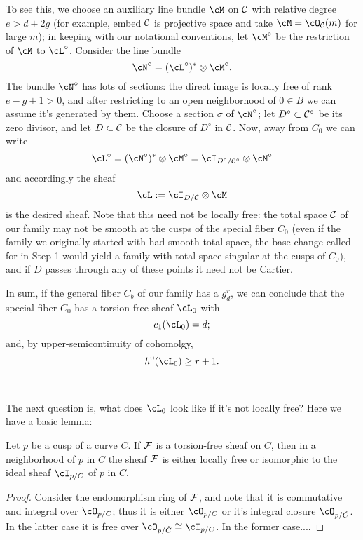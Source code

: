 To see this, we choose an auxiliary line bundle $\cM$ on $\cC$ with relative degree $e > d + 2g$ (for example, embed $\cC$ is projective space and take $\cM = \cO_{\cC}(m)$ for large $m$); in keeping with our notational conventions, let $\cM^\circ$ be the restriction of $\cM$ to $\cL^\circ$. Consider the line bundle 
$$
\cN^\circ = (\cL^\circ)^* \otimes \cM^\circ.
$$
The bundle $\cN^\circ$ has lots of sections: the direct image is locally free of rank $e-g+1 > 0$, and after restricting to an open neighborhood of $0 \in B$ we can assume it's generated by them. Choose a section $\sigma$ of $\cN^\circ$; let $D^\circ \subset \cC^\circ$ be its zero divisor, and let $D \subset \cC$ be the closure of $D^\circ$ in $\cC$. Now, away from $C_0$ we can write
$$
\cL^\circ = (\cN^\circ)^* \otimes \cM^\circ = \cI_{D^\circ/\cC^\circ} \otimes \cM^\circ
$$
and accordingly the sheaf
$$
\cL := \cI_{D/\cC} \otimes \cM
$$
is the desired sheaf. Note that this need not be locally free: the total space $\cC$ of our family may not be smooth at the cusps of the special fiber $C_0$ (even if the family we originally started with had smooth total space, the base change called for in Step 1 would yield a family with  total space singular at the cusps of $C_0$), and if $D$ passes through any of these points it need not be Cartier.

In sum, if the general fiber $C_b$ of our family has a $g^r_d$, we can conclude that the special fiber $C_0$ has a torsion-free sheaf $\cL_0$ with 
$$
c_1(\cL_0) = d;
$$
and, by upper-semicontinuity of cohomolgy,
$$
h^0(\cL_0) \geq r+1.
$$

\


The next question is, what does $\cL_0$ look like if it's not locally free? Here we have a basic lemma:

\begin{lemma}\label{torsion free at cusp}
Let $p$ be a  cusp of a curve $C$. If $\cF$ is a torsion-free sheaf on $C$, then in a neighborhood of $p$ in $C$ the sheaf $\cF$ is either locally free or isomorphic to the ideal sheaf $\cI_{p/C}$ of $p$ in $C$.
\end{lemma}

\begin{proof}
Consider the endomorphism ring of $\cF$, and note that it is commutative and integral over $\cO_{p/C}$; thus it is either 
$\cO_{p/C}$ or it's integral closure $\cO_{p/\tilde C}$. In the latter case it is  free over $\cO_{p/\tilde C}\cong \cI_{p/C}$.
In the former case....

\end{proof}

